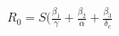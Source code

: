 \documentclass[preview]{standalone}
\begin{document}
\begin{center}
$R_0 = S (\frac{\beta_1}{\gamma} + \frac{\beta_2}{\alpha} + \frac{\beta_3}{\delta_c}$
\end{center}
\end{document}
